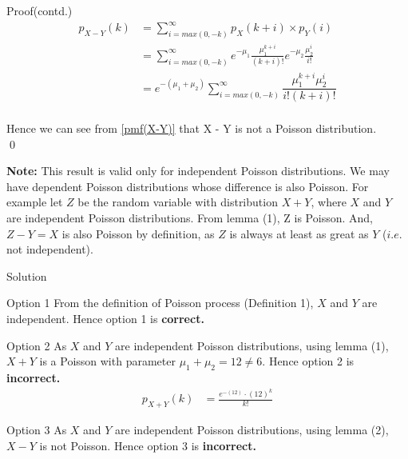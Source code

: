 \documentclass{beamer}
\begin{document}
\begin{frame}{}
\begin{block}{Proof(contd.)}
\vspace{-5mm}
\begin{align}
        p_{X-Y}(k) &= \sum_{i=max(0, -k)}^\infty p_X(k+i) \times p_Y(i)\\
        &=\sum_{i=max(0, -k)}^\infty e^{-\mu_1}\frac{\mu_1^{k+i}}{(k+i)!}e^{-\mu_2}\frac{\mu_2^i}{i!}\\
        &= e^{-(\mu_1 + \mu_2)}\sum_{i=max(0, -k)}^\infty \dfrac{\mu _{1}^{k+i}\mu _{2}^{i}}{i!(k+i)!}\label{pmf(X-Y)}
    \end{align}\\\vspace{-2mm}
    Hence we can see from \eqref{pmf(X-Y)} that X - Y is not a Poisson distribution.\\\qed
    
    \par \textbf{Note: } This result is valid only for independent Poisson distributions. We may have dependent Poisson distributions whose difference is also Poisson. For example let $Z$ be the random variable with distribution $X + Y$, where $X$ and $Y$ are independent Poisson distributions. From lemma (1), Z is Poisson. And, $Z - Y = X$ is also Poisson by definition, as $Z$ is always at least as great as $Y$ ($i.e.$ not independent).\\
    \end{block}    
\end{frame}
\begin{frame}{Solution}
    \begin{block}{Option 1}
        From the definition of Poisson process (Definition 1), $X$ and $Y$ are independent. Hence option 1 is \textbf{correct.}
    \end{block}
    \begin{block}{Option 2}
        As $X$ and $Y$ are independent Poisson distributions, using lemma (1), $X+ Y$ is a Poisson with parameter $\mu_1 + \mu_2 = 12 \neq 6$. Hence option 2 is \textbf{incorrect.}\vspace{-5mm}
    \begin{align}
         p_{X+Y}(k) &= \frac{e^{-(12)} \cdot (12)^k}{k!}\label{pmf(X+Y)}
    \end{align}
    \end{block}
    \begin{block}{Option 3}
        As $X$ and $Y$ are independent Poisson distributions, using lemma (2), $X-Y$ is not Poisson. Hence option 3 is \textbf{incorrect.}
    \end{block}
    \end{frame}
\end{document}
